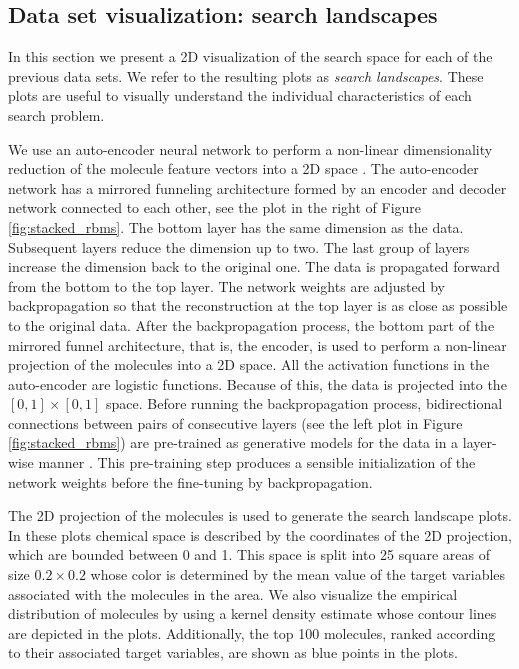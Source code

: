 \subsection{Data set visualization: search landscapes}

In this section we present a 2D visualization of the search space for each of
the previous data sets. We refer to the resulting plots as \emph{search
landscapes}. These plots are useful to visually understand the individual
characteristics of each search problem. 

We use an
auto-encoder neural network to perform a non-linear dimensionality reduction of the molecule feature vectors
into a 2D space \cite{Hinton_2006}. The auto-encoder network has a mirrored
funneling architecture formed by an encoder and decoder network connected to
each other, see the plot in the
right of Figure \ref{fig:stacked_rbms}. The bottom layer has the same dimension as the data. Subsequent
layers reduce the dimension up to two. The last group of layers
increase the dimension back to the original one. 
The data is propagated forward from the bottom to the top layer. The network
weights are adjusted by backpropagation so that the reconstruction at the top
layer is as close as possible to the original data. After
the backpropagation process, the bottom part of the mirrored funnel architecture, that is, the
encoder, is used to perform a non-linear projection of the molecules into a 2D
space. All the activation functions in the auto-encoder are logistic functions. Because of this, the data is projected into the $[0,1]\times[0,1]$ space. Before running the backpropagation process, bidirectional
connections between pairs of consecutive layers (see the left plot in Figure
\ref{fig:stacked_rbms}) are pre-trained as
generative models for the data in a layer-wise manner \cite{Hinton_2006}. This pre-training step
produces a sensible initialization of the network weights before the fine-tuning by backpropagation.

The 2D projection of the molecules is used to generate the search
landscape plots. In these plots chemical space is described by the coordinates of the 2D projection,
which are bounded between 0 and 1. This space is split into 25 square areas of size $0.2 \times 0.2$ whose 
color is determined by the mean value of the target variables associated with the molecules in the area. We also visualize the empirical distribution of molecules by using a kernel density estimate whose contour lines are depicted in the plots. Additionally, the top 100 molecules, ranked
according to their associated target variables, are shown as blue points in the plots.  

